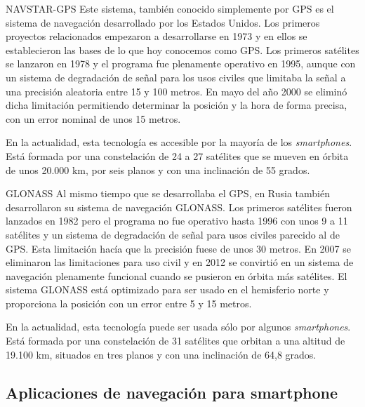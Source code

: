 \begin{definitionlist}
  \item[\acf{NAVSTAR-GPS}] Este sistema, también conocido simplemente por \acs{GPS} es el sistema
    de navegación desarrollado por los Estados Unidos. Los primeros proyectos relacionados empezaron
    a desarrollarse en 1973 y en ellos se establecieron las bases de lo que hoy conocemos como
    \acs{GPS}. Los primeros satélites se lanzaron en 1978 y el programa fue plenamente operativo en
    1995, aunque con un sistema de degradación de señal para los usos civiles que limitaba la señal
    a una precisión aleatoria entre 15 y 100 metros. En mayo del año 2000 se eliminó dicha
    limitación permitiendo determinar la posición y la hora de forma precisa, con un error nominal
    de unos 15 metros.

    En la actualidad, esta tecnología es accesible por la mayoría de los \emph{smartphones}. Está
    formada por una constelación de 24 a 27 satélites que se mueven en órbita de unos 20.000 km, por
    seis planos y con una inclinación de 55 grados.

  \item[GLONASS] Al mismo tiempo que se desarrollaba el \acs{GPS}, en Rusia también desarrollaron
    su sistema de navegación \acs{GLONASS}. Los primeros satélites fueron lanzados en 1982 pero el
    programa no fue operativo hasta 1996 con unos 9 a 11 satélites y un sistema de degradación de
    señal para usos civiles parecido al de \acs{GPS}. Esta limitación hacía que la precisión fuese
    de unos 30 metros. En 2007 se eliminaron las limitaciones para uso civil y en 2012 se convirtió
    en un sistema de navegación plenamente funcional cuando se pusieron en órbita más satélites. El
    sistema \acs{GLONASS} está optimizado para ser usado en el hemisferio norte y proporciona la
    posición con un error entre 5 y 15 metros.

    En la actualidad, esta tecnología puede ser usada sólo por algunos \emph{smartphones}. Está
    formada por una constelación de 31 satélites que orbitan a una altitud de 19.100 km, situados en
    tres planos y con una inclinación de 64,8 grados.

\end{definitionlist}


\subsection{Aplicaciones de navegación para smartphone}
\label{sec:apps}


